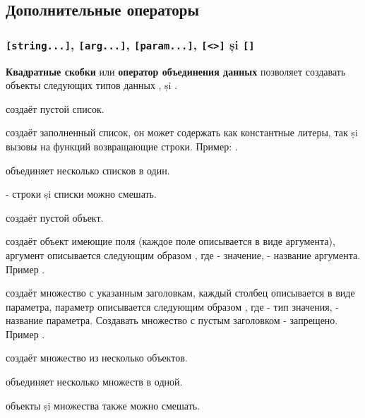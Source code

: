 \subsection{Дополнительные операторы}

\subsubsection{\lstinline`[string...]`, \lstinline`[arg...]`, \lstinline`[param...]`, \lstinline`[<>]` și \lstinline`[]`}

{\bf Квадратные скобки} или {\bf оператор объединения данных} позволяет создавать объекты следующих типов данных \listtype{}, \set{} și \object{}.

 создаёт пустой список.

 создаёт заполненный список, он может содержать как константные литеры, так și вызовы на функций возвращающие строки. Пример: \code{["a" "b" "c"]}.

 объединяет несколько списков в один.

 - строки și списки можно смешать.

 создаёт пустой объект.

 создаёт объект имеющие поля (каждое поле описывается в виде аргумента), аргумент описывается следующим образом , где  - значение,  - название аргумента. Пример .

 создаёт множество с указанным заголовкам, каждый столбец описывается в виде параметра, параметр описывается следующим образом , где  - тип значения,  - название параметра. Создавать множество с пустым заголовком - запрещено. Пример .

 создаёт множество из несколько объектов.

 объединяет несколько множеств в одной.

 объекты și множества также можно смешать.

